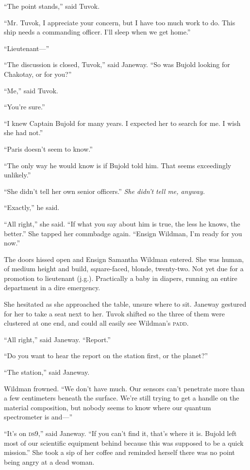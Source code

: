 \documentclass[twoside,letterpaper,12pt]{memoir}
\begin{document}
``The point stands,'' said Tuvok.

``Mr. Tuvok, I appreciate your concern, but I have too much work to do. This ship needs a commanding officer. I'll sleep when we get home.''

``Lieutenant---''

``The discussion is closed, Tuvok,'' said Janeway. ``So was Bujold looking for Chakotay, or for you?''

``Me,'' said Tuvok.

``You're sure.''

``I knew Captain Bujold for many years. I expected her to search for me. I wish she had not.''

``Paris doesn't seem to know.''

``The only way he would know is if Bujold told him. That seems exceedingly unlikely.''

``She didn’t tell her own senior officers.'' \textit{She didn’t tell me, anyway.}

``Exactly,'' he said.

``All right,'' she said. ``If what you say about him is true, the less he knows, the better.'' She tapped her commbadge again. ``Ensign Wildman, I'm ready for you now.''

The doors hissed open and Ensign Samantha Wildman entered. She was human, of medium height and build, square-faced, blonde, twenty-two. Not yet due for a promotion to lieutenant (j.g.). Practically a baby in diapers, running an entire department in a dire emergency.

She hesitated as she approached the table, unsure where to sit. Janeway gestured for her to take a seat next to her. Tuvok shifted so the three of them were clustered at one end, and could all easily see Wildman's \textsc{padd}.

``All right,'' said Janeway. ``Report.''

``Do you want to hear the report on the station first, or the planet?''

``The station,'' said Janeway.

Wildman frowned. ``We don't have much. Our sensors can't penetrate more than a few centimeters beneath the surface. We're still trying to get a handle on the material composition, but nobody seems to know where our quantum spectrometer is and---''

``It's on \textsc{ds9},'' said Janeway. ``If you can't find it, that's where it is. Bujold left most of our scientific equipment behind because this was supposed to be a quick mission.'' She took a sip of her coffee and reminded herself there was no point being angry at a dead woman.
\end{document}
